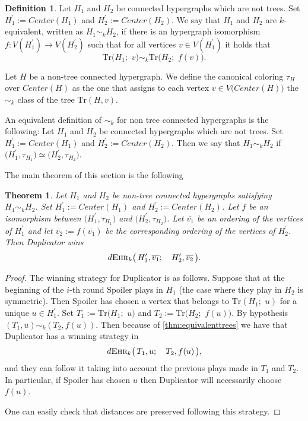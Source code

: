 \documentclass[12pt,notitlepage,a4paper]{article}
\newtheorem{theorem}{Theorem}[section]
\theoremstyle{definition}
\newtheorem{definition}{Definition}[section]
\newcommand{\ehr}{\textsc{Ehr}}
\begin{document}
\begin{definition}
	Let $H_1$ and $H_2$ be connected hypergraphs which are not trees.
	Set $H^\prime_1:= Center(H_1)$ and $H^\prime_2:= Center(H_2)$.
	We say that $H_1$ and $H_2$ are $k$-equivalent,
	written as $H_1\sim_k H_2$, if there is an hypergraph isomorphism
	$f:V(H^\prime_1)\rightarrow V(H^\prime_2)$ such that for all vertices
	$v\in V(H^\prime_1)$ it holds that
	\[
	\mathrm{Tr}\big(H_1;\,\, v\big)\sim_k 
	\mathrm{Tr}\big(H_2;\,\, f(v)\big).
	\] 
\end{definition}
	Let $H$ be a non-tree connected hypergraph. We define
	the canonical coloring $\tau_{H}$ over $Center(H)$
	as the one that assigns to each vertex $v\in V\big(
	Center(H)\big)$ the $\sim_k$ class of the tree
	$\mathrm{Tr}(H,v)$.\par
	An equivalent definition of $\sim_k$ for non tree connected
	hypergraphs is the following: 
	Let $H_1$ and $H_2$ be connected hypergraphs which are not trees.
	Set $H^\prime_1:= Center(H_1)$ and $H^\prime_2:= Center(H_2)$.
	Then we say that $H_1\sim_k H_2$ if
	$\big( H^\prime_1,\tau_{H_1}\big) \simeq 
	\big(H^\prime_2,\tau_{H_2}\big)$.\par
	The main theorem of this section is the following
	
	\begin{theorem} \label{thm:strategyaux}
		Let $H_1$ and $H_2$ be non-tree 
		connected hypergraphs satisfying
		$H_1\sim_k H_2$. 
		Set $H^\prime_1:= Center(H_1)$ and 
		$H^\prime_2:= Center(H_2)$. Let $f$ be an isomorphism
		between $\big( H^\prime_1,\tau_{H_1}\big)$ and 
		$\big(H^\prime_2,\tau_{H_2}\big)$. Let $\overline{v_1}$ 
		be an ordering of the vertices of $H^\prime_1$ and let
		$\overline{v_2}:=f(\overline{v_1})$ be the corresponding
		ordering of the vertices of $H^\prime_2$. Then
		Duplicator wins 
		\[	d\ehr_{k}\big(\,
		H^\prime_1,\overline{v_1};\quad
		H^\prime_2,\overline{v_2}\,
		\big).
		\]
	\end{theorem}
	\begin{proof}
		The winning strategy for Duplicator is as follows. 
		Suppose that at the beginning of the $i$-th round
		Spoiler plays in $H_1$ (the case where they play in
		$H_2$ is symmetric). Then Spoiler has chosen a vertex 
		that belongs to $\mathrm{Tr}(H_1;\,\,u)$ for a unique
		$u\in H^\prime_1$. 
		Set $T_1:=\mathrm{Tr}\big(H_1;\,\,u\big)$ and
		$T_2:=\mathrm{Tr}\big(H_2;\,\,f(u)\big)$.
		By hypothesis
		$(T_1,u)\sim_k (T_2,f(u))$. 
		Then because of \cref{thm:equivalenttrees} we have that
		Duplicator has a winning strategy in
		\[
		d\ehr_{k}\big(\,
		T_1,u; \quad T_2, f(u)\,\big),
		\]
		and they can follow it taking into account the previous
		plays made in $T_1$ and $T_2$. In particular, 
		if Spoiler has chosen
		$u$ then Duplicator will necessarily choose $f(u)$.\par
		One can easily check that distances are preserved
		following this strategy. 
	\end{proof}
		
\end{document}
